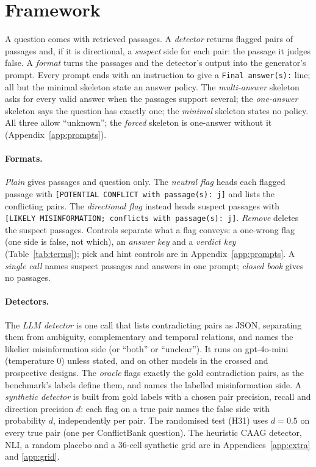 \section{Framework}
\label{sec:method}

A question comes with retrieved passages. A \emph{detector} returns flagged pairs of passages and, if it is
directional, a \emph{suspect} side for each pair: the passage it judges false. A \emph{format} turns
the passages and the detector's output into the generator's prompt. Every prompt ends with an instruction to give a
\texttt{Final answer(s):} line; all but the minimal skeleton state an answer policy. The \emph{multi-answer} skeleton asks for every valid
answer when the passages support several; the \emph{one-answer} skeleton says the question has exactly one; the
\emph{minimal} skeleton states no policy. All three allow ``unknown''; the \emph{forced} skeleton is one-answer
without it (Appendix~\ref{app:prompts}).

\paragraph{Formats.}
\emph{Plain} gives passages and question only. The \emph{neutral flag} heads each flagged passage with
\texttt{[POTENTIAL CONFLICT with passage(s): j]} and lists the conflicting pairs. The \emph{directional flag}
instead heads suspect passages with \texttt{[LIKELY MISINFORMATION; conflicts with passage(s): j]}. \emph{Remove}
deletes the suspect passages. Controls separate what a flag conveys: a one-wrong flag (one side is false, not
which), an \emph{answer key} and a \emph{verdict key} (Table~\ref{tab:terms}); pick and hint
controls are in Appendix~\ref{app:prompts}. A \emph{single call} names suspect passages and
answers in one prompt; \emph{closed book} gives no passages.

\paragraph{Detectors.}
The \emph{LLM detector} is one call that lists contradicting pairs as JSON, separating them from ambiguity,
complementary and temporal relations, and names the likelier misinformation side (or ``both'' or ``unclear''). It
runs on gpt-4o-mini (temperature 0) unless stated, and on other models in the crossed and prospective designs. The \emph{oracle}
flags exactly the gold contradiction pairs, as the benchmark's labels define them, and names the labelled
misinformation side. A \emph{synthetic detector} is built from gold labels with a chosen pair precision, recall and
direction precision $d$: each flag on a true pair names the false side with probability $d$, independently per
pair. The randomised test (H31) uses $d=0.5$ on every true pair (one per ConflictBank question). The heuristic CAAG detector, NLI, a random
placebo and a 36-cell synthetic grid are in Appendices~\ref{app:extra} and \ref{app:grid}.

